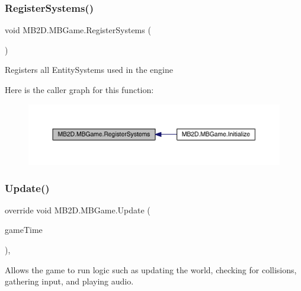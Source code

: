 \subsubsection{\texorpdfstring{Register\+Systems()}{RegisterSystems()}}
{\footnotesize\ttfamily void M\+B2\+D.\+M\+B\+Game.\+Register\+Systems (\begin{DoxyParamCaption}{ }\end{DoxyParamCaption})\hspace{0.3cm}{\ttfamily [inline]}}



Registers all Entity\+Systems used in the engine 

Here is the caller graph for this function\+:\nopagebreak
\begin{figure}[H]
\begin{center}
\leavevmode
\includegraphics[width=350pt]{class_m_b2_d_1_1_m_b_game_ad7e9a60dbaefe1416db0456b07b13487_icgraph}
\end{center}
\end{figure}
\hypertarget{class_m_b2_d_1_1_m_b_game_a82968a66f75f9c437074ce7bfd468455}{}\label{class_m_b2_d_1_1_m_b_game_a82968a66f75f9c437074ce7bfd468455} 
\subsubsection{\texorpdfstring{Update()}{Update()}}
{\footnotesize\ttfamily override void M\+B2\+D.\+M\+B\+Game.\+Update (\begin{DoxyParamCaption}\item[{Game\+Time}]{game\+Time }\end{DoxyParamCaption})\hspace{0.3cm}{\ttfamily [inline]}, {\ttfamily [protected]}}



Allows the game to run logic such as updating the world, checking for collisions, gathering input, and playing audio. 


